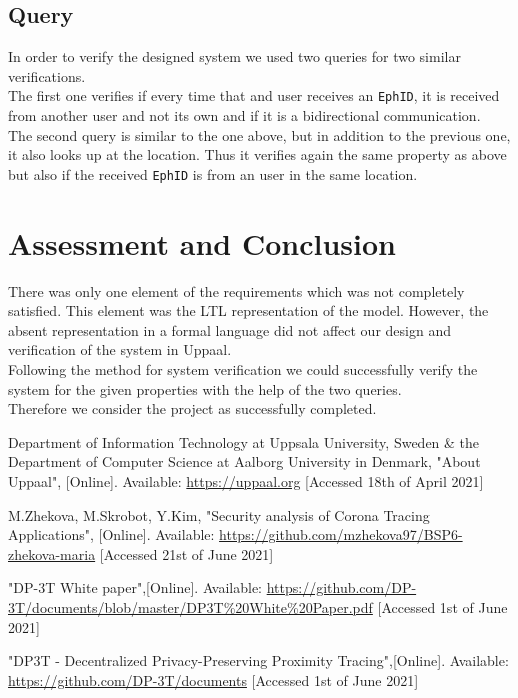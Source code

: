 \documentclass[a4paper, twocolumn]{article}
\begin{document}
\subsection{Query}
In order to verify the designed system we used two queries for two similar verifications.\\
The first one verifies if every time that and user receives an \texttt{EphID}, it is received from another user and not its own and if it is a bidirectional communication.\\
The second query is similar to the one above, but in addition to the previous one, it also looks up at the location. Thus it verifies again the same property as above but also if the received \texttt{EphID} is from an user in the same location.

\section{Assessment and Conclusion}
There was only one element of the requirements which was not completely satisfied. This element was the LTL representation of the model. However, the absent representation in a formal language did not affect our design and verification of the system in Uppaal.\\ Following the method for system verification we could successfully verify the system for the given properties with the help of the two queries.\\
Therefore we consider the project as successfully completed.

\newpage
\begin{thebibliography}{9}

Department of Information Technology at Uppsala University, Sweden \& the Department of Computer Science at Aalborg University in Denmark, "About Uppaal", [Online]. Available: \url{https://uppaal.org} [Accessed 18th of April 2021]

M.Zhekova, M.Skrobot, Y.Kim, "Security analysis of Corona Tracing Applications", [Online]. Available:  \url{https://github.com/mzhekova97/BSP6-zhekova-maria} [Accessed 21st of June 2021]

"DP-3T White paper",[Online]. Available: \url{https://github.com/DP-3T/documents/blob/master/DP3T\%20White\%20Paper.pdf} [Accessed 1st of June 2021]

"DP3T - Decentralized Privacy-Preserving Proximity Tracing",[Online]. Available: \url{https://github.com/DP-3T/documents} [Accessed 1st of June 2021]

\end{thebibliography}
\newpage
\end{document}
